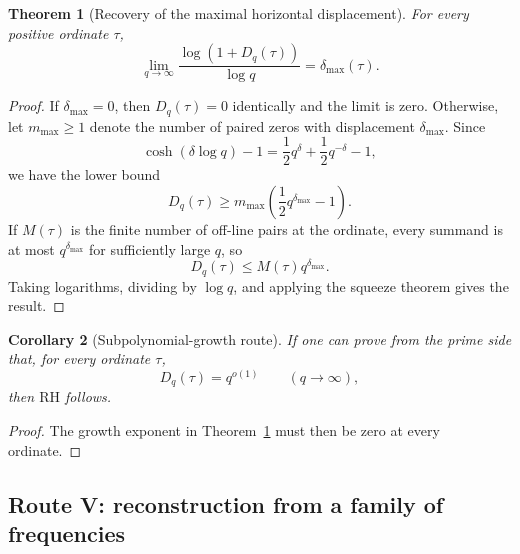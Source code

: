 \documentclass[11pt]{amsart}
\numberwithin{equation}{section}
\theoremstyle{plain}
\newtheorem{theorem}{Theorem}[section]
\newtheorem{corollary}[theorem]{Corollary}
\theoremstyle{definition}
\theoremstyle{remark}
\newcommand{\RH}{\mathrm{RH}}
\newcommand{\1}{\mathbf{1}}
\begin{document}
\begin{theorem}[Recovery of the maximal horizontal displacement]
\label{thm:large_q_growth_exponent}
For every positive ordinate \(\tau\),
\begin{equation}
\boxed{
\lim_{q\to\infty}
\frac{\log\left(1+D_q(\tau)\right)}{\log q}
=
\delta_{\max}(\tau).
}
\label{eq:large_q_growth_exponent}
\end{equation}
\end{theorem}

\begin{proof}
If \(\delta_{\max}=0\), then \(D_q(\tau)=0\) identically and the limit is
zero.  Otherwise, let \(m_{\max}\geq1\) denote the number of paired zeros
with displacement \(\delta_{\max}\).  Since
\begin{equation}
\cosh(\delta\log q)-1
=
\frac12q^\delta+\frac12q^{-\delta}-1,
\label{eq:large_q_each_term}
\end{equation}
we have the lower bound
\begin{equation}
D_q(\tau)
\geq
m_{\max}\left(\frac12q^{\delta_{\max}}-1\right).
\label{eq:large_q_lower}
\end{equation}
If \(M(\tau)\) is the finite number of off-line pairs at the ordinate,
every summand is at most \(q^{\delta_{\max}}\) for sufficiently large
\(q\), so
\begin{equation}
D_q(\tau)
\leq
M(\tau)q^{\delta_{\max}}.
\label{eq:large_q_upper}
\end{equation}
Taking logarithms, dividing by \(\log q\), and applying the squeeze theorem
gives the result.
\end{proof}

\begin{corollary}[Subpolynomial-growth route]
\label{cor:subpolynomial_growth_route}
If one can prove from the prime side that, for every ordinate \(\tau\),
\begin{equation}
D_q(\tau)=q^{o(1)}
\qquad(q\to\infty),
\label{eq:subpolynomial_defect}
\end{equation}
then \(\RH\) follows.
\end{corollary}

\begin{proof}
The growth exponent in Theorem~\ref{thm:large_q_growth_exponent} must then
be zero at every ordinate.
\end{proof}

\subsection{Route V: reconstruction from a family of frequencies}
\label{subsec:route_family_q}
\end{document}

